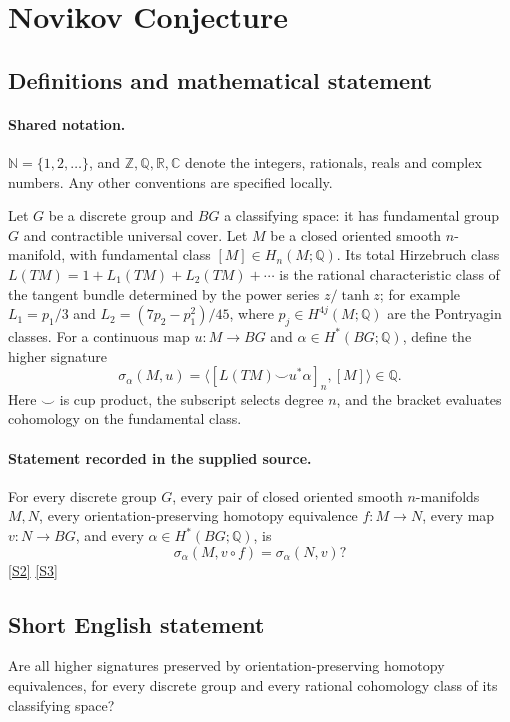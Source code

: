 \documentclass[11pt]{article}
\newcommand{\sref}[2]{\hyperlink{source:#1:#2}{[S#2]}}
\begin{document}
\section{Novikov Conjecture}\label{statement}

\subsection{Definitions and mathematical statement}

\paragraph{Shared notation.}$\mathbb N=\{1,2,\ldots\}$, and $\mathbb Z,\mathbb Q,\mathbb R,\mathbb C$ denote the integers, rationals, reals and complex numbers. Any other conventions are specified locally.


Let \(G\) be a discrete group and \(BG\) a classifying space:
it has fundamental group \(G\) and contractible universal cover.
Let \(M\) be a closed oriented smooth \(n\)-manifold, with fundamental
class \([M]\in H_n(M;\mathbb Q)\). Its total Hirzebruch class
\(L(TM)=1+L_1(TM)+L_2(TM)+\cdots\) is the rational characteristic
class of the tangent bundle determined by the power series \(z/\tanh z\);
for example \(L_1=p_1/3\) and \(L_2=(7p_2-p_1^2)/45\), where
\(p_j\in H^{4j}(M;\mathbb Q)\) are the Pontryagin classes.
For a continuous map \(u:M\to BG\) and
\(\alpha\in H^*(BG;\mathbb Q)\), define the higher signature
\[
 \sigma_\alpha(M,u)=\bigl\langle
       [L(TM)\smile u^*\alpha]_n,[M]\bigr\rangle\in\mathbb Q.
\]
Here \(\smile\) is cup product, the subscript selects degree \(n\),
and the bracket evaluates cohomology on the fundamental class.
\paragraph{Statement recorded in the supplied source.}
For every discrete group \(G\), every pair of closed oriented smooth
\(n\)-manifolds \(M,N\), every orientation-preserving homotopy equivalence
\(f:M\to N\), every map \(v:N\to BG\), and every
\(\alpha\in H^*(BG;\mathbb Q)\), is
\[
 \sigma_\alpha(M,v\circ f)=\sigma_\alpha(N,v)?
\] \sref{statement}{2} \sref{statement}{3}
\subsection{Short English statement}
Are all higher signatures preserved by orientation-preserving homotopy equivalences, for every discrete group and every rational cohomology class of its classifying space?
\end{document}
